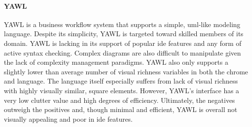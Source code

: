 \paragraph{YAWL} YAWL is a business workflow system that supports a simple,
\acs{uml}-like modeling language. Despite its simplicity, YAWL is targeted
toward skilled members of its domain. YAWL is lacking in its support of
popular \ac{ide} features and any form of active syntax checking. Complex
diagrams are also difficult to manipulate given the lack of complexity
management paradigms. YAWL also only supports a slightly lower than
average number of visual richness variables in both the chrome and
language. The language itself especially suffers from lack of visual
richness with highly visually similar, square elements. However, YAWL's
interface has a very low clutter value and high degrees of efficiency.
Ultimately, the negatives outweigh the positives and, though minimal and
efficient, YAWL is overall not visually appealing and poor in \ac{ide}
features.

